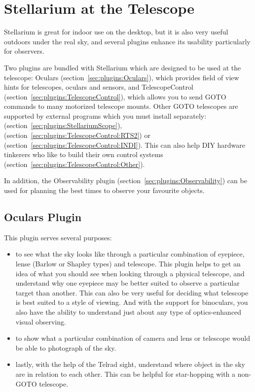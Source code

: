 \chapter{Stellarium at the Telescope}
\label{ch:atTheTelescope}

Stellarium is great for indoor use on the desktop, but it is also very
useful outdoors under the real sky, and several plugins enhance its
usability particularly for observers.

Two plugins are bundled with Stellarium which are designed to be used
at the telescope: Oculars (section~\ref{sec:plugins:Oculars}), which
provides field of view hints for telescopes, oculars and sensors, and
TelescopeControl (section~\ref{sec:plugins:TelescopeControl}), which
allows you to send GOTO commands to many motorized telescope mounts. Other
GOTO telescopes are supported by external programs which you must
install separately: 
(section~\ref{sec:plugins:StellariumScope}),  (section~\ref{sec:plugins:TelescopeControl:RTS2}) 
or  (section~\ref{sec:plugins:TelescopeControl:INDI}). This can also help DIY hardware 
tinkerers who like to build their own control systems (section~\ref{sec:plugins:TelescopeControl:Other}).

In addition, the Observability plugin (section~\ref{sec:plugins:Observability})
can be used for planning the best times to observe your favourite
objects.

\section{Oculars Plugin}
\label{sec:plugins:Oculars}

This plugin serves several purposes:
\begin{itemize}
\item to see what the sky looks like through a particular combination of eyepiece, lense (Barlow or Shapley types) and telescope. This plugin helps to get an idea of what you should see when looking through a physical telescope, and understand why one eyepiece may be better suited to observe a particular target than another. This can also be very useful for deciding what telescope is best suited to a style of viewing. And with the support for binoculars, you also have the ability to understand just about any type of optics-enhanced visual observing.
\item to show what a particular combination of camera and lens or telescope would be able to photograph of the sky. 
\item lastly, with the help of the Telrad sight, understand where object in the sky are in relation to each other. 
This can be helpful for star-hopping with a non-GOTO telescope. 
\end{itemize}

